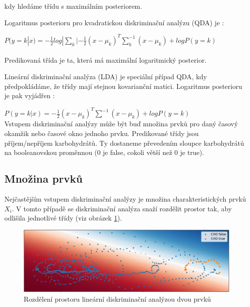 \\\\
kdy hledáme třídu s maximálním posteriorem.

Logaritmus posterioru pro kvadratickou diskriminační analýzu (QDA) je \citep{cho.book.lda}:

$P(y=k|x)=-\frac{1}{2}log|\sum_{k}|-\frac{1}{2}(x-\mu_{k})^{T}\sum^{-1}_{k}(x-\mu_{k})+logP(y=k)$\\\\
Predikovaná třída je ta, která má maximální logaritmický posterior.

Lineární diskriminační analýza (LDA) je speciální případ QDA, kdy předpokládáme, že třídy mají stejnou kovarianční matici. Logaritmus posterioru je pak vyjádřen \citep{cho.scikit.lda}:

$P(y=k|x)=-\frac{1}{2}(x-\mu_{k})^{T}\sum^{-1}(x-\mu_{k})+logP(y=k)$\\

Vstupem diskriminační analýzy může být buď množina prvků pro daný časový okamžik nebo časové okno jednoho prvku. Predikované třídy jsou příjem/nepříjem karbohydrátů. Ty dostaneme převedením sloupce karbohydrátů na booleanovskou proměnnou (0 je false, cokoli větší než 0 je true).

\subsection{Množina prvků}

Nejčastějším vstupem diskriminační analýzy je množina charakteristických prvků $X_{i}$. V tomto případě se diskriminační analýza snaží rozdělit prostor tak, aby odlišila jednotlivé třídy (viz obrázek \ref{fig:lda}).

\begin{figure}[H]
\caption{Rozdělení prostoru lineární diskriminační analýzou dvou prvků}
\label{fig:lda}
\centering
\includegraphics[width=1\textwidth]{img/cho/lda2.png}
\end{figure}

